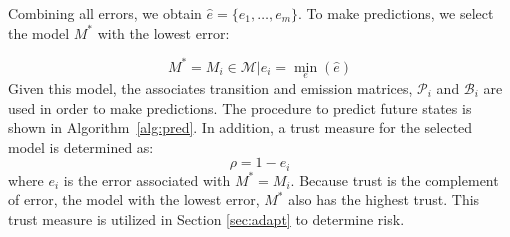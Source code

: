 \documentclass[letterpaper, 10 pt, conference]{ieeeconf}  %
\newcommand\NB[1]{$\spadesuit$\footnote{NB: #1}}
\begin{document}
Combining all errors, we obtain $\hat{e} = \{e_1,\ldots,e_m\}$. To make predictions, we select the model $M^*$ with the lowest error: %

\begin{equation}
    M^*=M_i\in\mathcal{M}\vert e_i = \min_e(\hat{e})
\end{equation}
  Given this model, the associates transition and emission matrices, $\mathcal{P}_{i}$ and $\mathcal{B}_{i}$ are used in order to make predictions. The procedure to predict future states is shown in Algorithm~\ref{alg:pred}. In addition, a trust measure for the selected model is determined as:
  \begin{equation}
    \rho = 1-e_i
 \end{equation}
 where $e_i$ is the error associated with $M^* = M_i$. Because trust is the complement of error, the model with the lowest error, $M^*$ also has the highest trust. This trust measure is utilized in Section \ref{sec:adapt} to determine risk.
  
  


\end{document}
